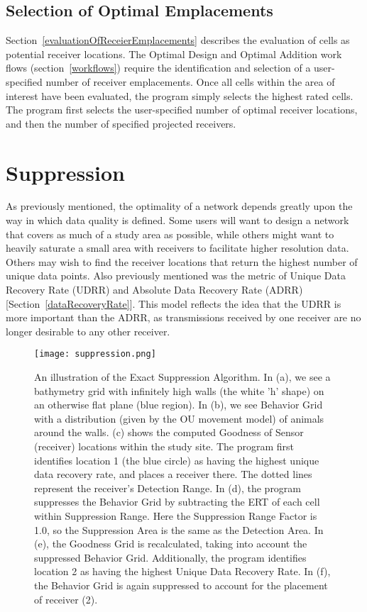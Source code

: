 \subsection{Selection of Optimal Emplacements}
\label{selectionOfOptimalEmplacements}
Section~\ref{evaluationOfReceierEmplacements} describes the evaluation of cells as potential receiver locations.  The Optimal Design and Optimal Addition work flows (section~\ref{workflows}) require the identification and selection of a user-specified number of receiver emplacements.  Once all cells within the area of interest have been evaluated, the program simply selects the highest rated cells.  The program first selects the user-specified number of optimal receiver locations, and then the number of specified projected receivers.


\section{Suppression}
\label{suppression}
As previously mentioned, the optimality of a network depends greatly upon the way in which data quality is defined.  Some users will want to design a network that covers as much of a study area as possible, while others might want to heavily saturate a small area with receivers to facilitate higher resolution data.  Others may wish to find the receiver locations that return the highest number of unique data points.  Also previously mentioned was the metric of Unique Data Recovery Rate (UDRR) and Absolute Data Recovery Rate (ADRR) [Section~\ref{dataRecoveryRate}].  This model reflects the idea that the UDRR is more important than the ADRR, as transmissions received by one receiver are no longer desirable to any other receiver.

\begin{figure}[ht]
	\centering
	\texttt{[image: suppression.png]}
	\caption{An illustration of the Exact Suppression Algorithm.  In (a), we see a bathymetry grid with infinitely high walls (the white 'h' shape) on an otherwise flat plane (blue region).  In (b), we see Behavior Grid with a distribution (given by the OU movement model) of animals around the walls.  (c) shows the computed Goodness of Sensor (receiver) locations within the study site.  The program first identifies location 1 (the blue circle) as having the highest unique data recovery rate, and places a receiver there.  The dotted lines represent the receiver's Detection Range.  In (d), the program suppresses the Behavior Grid by subtracting the ERT of each cell within Suppression Range.  Here the Suppression Range Factor is 1.0, so the Suppression Area is the same as the Detection Area.  In (e), the Goodness Grid is recalculated, taking into account the suppressed Behavior Grid.  Additionally, the program identifies location 2 as having the highest Unique Data Recovery Rate.  In (f), the Behavior Grid is again suppressed to account for the placement of receiver (2).
		\label{suppressionImage}}
\end{figure}

